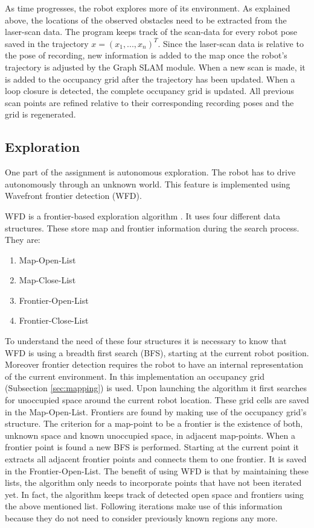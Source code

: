 \documentclass{ba-kecs}
\begin{document}
As time progresses, the robot explores more of its environment. As explained above, the locations of the observed obstacles need to be extracted from the laser-scan data. The program keeps track of the scan-data for every robot pose saved in the trajectory \(x = (x_1, ..., x_n)^T \). Since the laser-scan data is relative to the pose of recording, new information is added to the map once the robot's trajectory is adjusted by the Graph SLAM module. When a new scan is made, it is added to the occupancy grid after the trajectory has been updated. When a loop closure is detected, the complete occupancy grid is updated. All previous scan points are refined relative to their corresponding recording poses and the grid is regenerated.

\subsection{Exploration}
\label{sec:wfd}
One part of the assignment is autonomous exploration. The robot has to drive autonomously through an unknown world. This feature is implemented using Wavefront frontier detection (WFD).

WFD is a frontier-based exploration algorithm \citep{Keidar}. It uses four different data structures. These store map and frontier information during the search process. They are:
\begin{enumerate}
\item{Map-Open-List}
\item{Map-Close-List}
\item{Frontier-Open-List}
\item{Frontier-Close-List}
\end{enumerate}
To understand the need of these four structures it is necessary to know that WFD is using a breadth first search (BFS), starting at the current robot position. Moreover frontier detection requires the robot to have an internal representation of the current environment. In this implementation an occupancy grid (Subsection \ref{sec:mapping}) is used.
Upon launching the algorithm it first searches for unoccupied space around the current robot location. These grid cells are saved in the Map-Open-List. 
Frontiers are found by making use of the occupancy grid's structure. The criterion for a map-point to be a frontier is the existence of both, unknown space and known unoccupied space, in adjacent map-points. When a frontier point is found a new BFS is performed. Starting at the current point it extracts all adjacent frontier points and connects them to one frontier. It is saved in the Frontier-Open-List. The benefit of using WFD is that by maintaining these lists, the algorithm only needs to incorporate points that have not been iterated yet. In fact, the algorithm keeps track of detected open space and frontiers using the above mentioned list. Following iterations make use of this information because they do not need to consider previously known regions any more.
 
\end{document}
